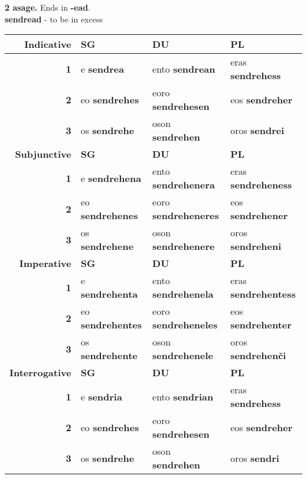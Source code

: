 \documentclass{book}
\begin{document}
\begin{center}
  \textbf{2 asage.} Ends in \textbf{-ead}. \\
  \textbf{sendread} - to be in excess \\
  \begin{tabular}{|r|l|l|l|}
    \hline
    \textbf{Indicative} & \textbf{SG} & \textbf{DU} & \textbf{PL} \\ \hline
    \textbf{1} & e \textbf{sendrea} & ento \textbf{sendrean} & eras \textbf{sendrehess} \\ \hline
    \textbf{2} & eo \textbf{sendrehes} & eoro \textbf{sendrehesen} & eos \textbf{sendreher} \\ \hline
    \textbf{3} & os \textbf{sendrehe} & oson \textbf{sendrehen} & oros \textbf{sendrei} \\ \hline
    \textbf{Subjunctive} & \textbf{SG} & \textbf{DU} & \textbf{PL} \\ \hline
    \textbf{1} & e \textbf{sendrehena} & ento \textbf{sendrehenera} & eras \textbf{sendreheness} \\ \hline
    \textbf{2} & eo \textbf{sendrehenes} & eoro \textbf{sendreheneres} & eos \textbf{sendrehener} \\ \hline
    \textbf{3} & os \textbf{sendrehene} & oson \textbf{sendrehenere} & oros \textbf{sendreheni} \\ \hline
    \textbf{Imperative} & \textbf{SG} & \textbf{DU} & \textbf{PL} \\ \hline
    \textbf{1} & e \textbf{sendrehenta} & ento \textbf{sendrehenela} & eras \textbf{sendrehentess} \\ \hline
    \textbf{2} & eo \textbf{sendrehentes} & eoro \textbf{sendreheneles} & eos \textbf{sendrehenter} \\ \hline
    \textbf{3} & os \textbf{sendrehente} & oson \textbf{sendrehenele} & oros \textbf{sendrehenči} \\ \hline
    \textbf{Interrogative} & \textbf{SG} & \textbf{DU} & \textbf{PL} \\ \hline
    \textbf{1} & e \textbf{sendria} & ento \textbf{sendrian} & eras \textbf{sendrehess} \\ \hline
    \textbf{2} & eo \textbf{sendrehes} & eoro \textbf{sendrehesen} & eos \textbf{sendreher} \\ \hline
    \textbf{3} & os \textbf{sendrehe} & oson \textbf{sendrehen} & oros \textbf{sendri} \\ \hline
  \end{tabular}


\end{center}
\end{document}
